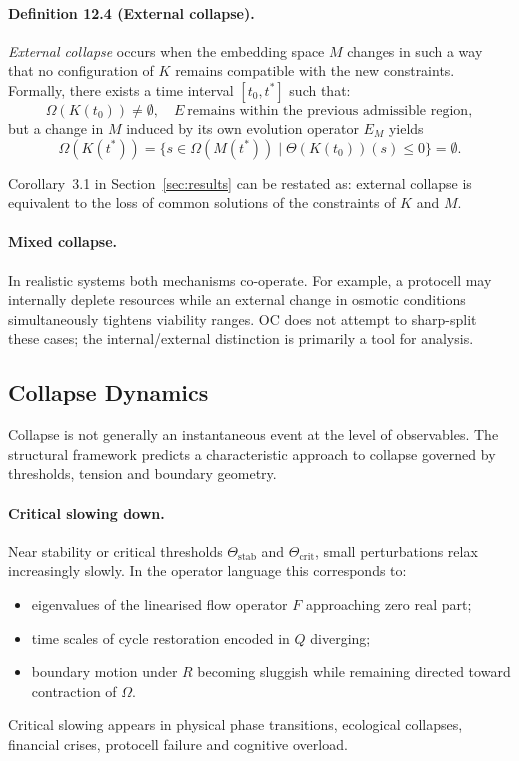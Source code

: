 \paragraph{Definition 12.4 (External collapse).}
\emph{External collapse} occurs when the embedding space \(M\) changes in such
a way that no configuration of \(K\) remains compatible with the new
constraints. Formally, there exists a time interval \([t_0,t^{\ast}]\) such
that:
\[
  \Omega(K(t_0))\neq\emptyset,
  \quad
  E\ \text{remains within the previous admissible region},
\]
but a change in \(M\) induced by its own evolution operator \(E_M\) yields
\[
  \Omega(K(t^{\ast})) =
    \big\{ s \in \Omega(M(t^{\ast})) \mid
           \Theta(K(t_0))(s)\le 0 \big\} = \emptyset.
\]

Corollary~3.1 in Section~\ref{sec:results} can be restated as:
external collapse is equivalent to the loss of common solutions of the
constraints of \(K\) and \(M\).

\paragraph{Mixed collapse.}
In realistic systems both mechanisms co-operate. For example, a protocell
may internally deplete resources while an external change in osmotic
conditions simultaneously tightens viability ranges. OC does not attempt to
sharp-split these cases; the internal/external distinction is primarily a
tool for analysis.

\subsection{Collapse Dynamics}

Collapse is not generally an instantaneous event at the level of observables.
The structural framework predicts a characteristic approach to collapse
governed by thresholds, tension and boundary geometry.

\paragraph{Critical slowing down.}
Near stability or critical thresholds \(\Theta_{\mathrm{stab}}\) and
\(\Theta_{\mathrm{crit}}\), small perturbations relax increasingly slowly.
In the operator language this corresponds to:
\begin{itemize}
  \item eigenvalues of the linearised flow operator \(F\) approaching zero
        real part;
  \item time scales of cycle restoration encoded in \(Q\) diverging;
  \item boundary motion under \(R\) becoming sluggish while remaining directed
        toward contraction of \(\Omega\).
\end{itemize}
Critical slowing appears in physical phase transitions, ecological collapses,
financial crises, protocell failure and cognitive overload.

